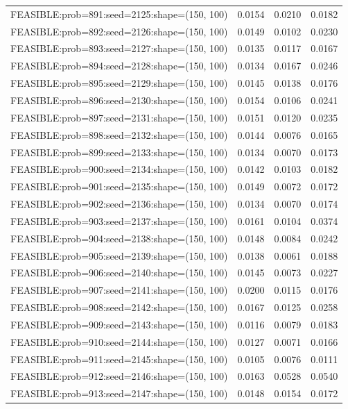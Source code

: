 \begin{longtable}{lccc}
FEASIBLE:prob=891:seed=2125:shape=(150, 100) &   0.0154 & 0.0210 & 0.0182 \\
FEASIBLE:prob=892:seed=2126:shape=(150, 100) &   0.0149 & 0.0102 & 0.0230 \\
FEASIBLE:prob=893:seed=2127:shape=(150, 100) &   0.0135 & 0.0117 & 0.0167 \\
FEASIBLE:prob=894:seed=2128:shape=(150, 100) &   0.0134 & 0.0167 & 0.0246 \\
FEASIBLE:prob=895:seed=2129:shape=(150, 100) &   0.0145 & 0.0138 & 0.0176 \\
FEASIBLE:prob=896:seed=2130:shape=(150, 100) &   0.0154 & 0.0106 & 0.0241 \\
FEASIBLE:prob=897:seed=2131:shape=(150, 100) &   0.0151 & 0.0120 & 0.0235 \\
FEASIBLE:prob=898:seed=2132:shape=(150, 100) &   0.0144 & 0.0076 & 0.0165 \\
FEASIBLE:prob=899:seed=2133:shape=(150, 100) &   0.0134 & 0.0070 & 0.0173 \\
FEASIBLE:prob=900:seed=2134:shape=(150, 100) &   0.0142 & 0.0103 & 0.0182 \\
FEASIBLE:prob=901:seed=2135:shape=(150, 100) &   0.0149 & 0.0072 & 0.0172 \\
FEASIBLE:prob=902:seed=2136:shape=(150, 100) &   0.0134 & 0.0070 & 0.0174 \\
FEASIBLE:prob=903:seed=2137:shape=(150, 100) &   0.0161 & 0.0104 & 0.0374 \\
FEASIBLE:prob=904:seed=2138:shape=(150, 100) &   0.0148 & 0.0084 & 0.0242 \\
FEASIBLE:prob=905:seed=2139:shape=(150, 100) &   0.0138 & 0.0061 & 0.0188 \\
FEASIBLE:prob=906:seed=2140:shape=(150, 100) &   0.0145 & 0.0073 & 0.0227 \\
FEASIBLE:prob=907:seed=2141:shape=(150, 100) &   0.0200 & 0.0115 & 0.0176 \\
FEASIBLE:prob=908:seed=2142:shape=(150, 100) &   0.0167 & 0.0125 & 0.0258 \\
FEASIBLE:prob=909:seed=2143:shape=(150, 100) &   0.0116 & 0.0079 & 0.0183 \\
FEASIBLE:prob=910:seed=2144:shape=(150, 100) &   0.0127 & 0.0071 & 0.0166 \\
FEASIBLE:prob=911:seed=2145:shape=(150, 100) &   0.0105 & 0.0076 & 0.0111 \\
FEASIBLE:prob=912:seed=2146:shape=(150, 100) &   0.0163 & 0.0528 & 0.0540 \\
FEASIBLE:prob=913:seed=2147:shape=(150, 100) &   0.0148 & 0.0154 & 0.0172 \\

\end{longtable}
